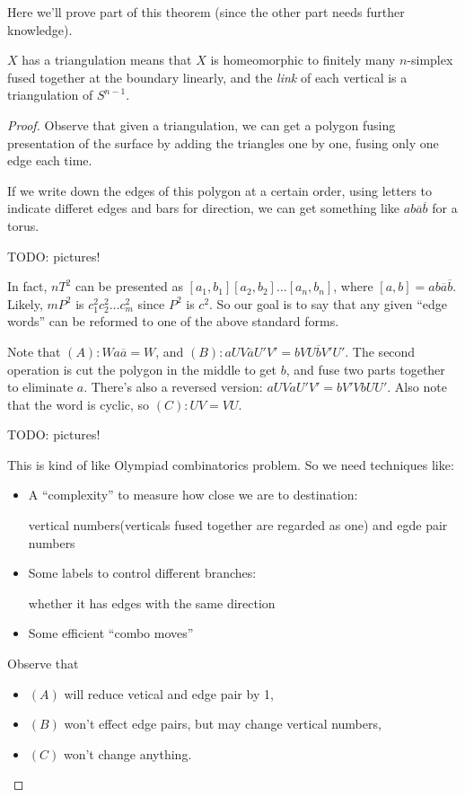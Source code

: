 Here we'll prove part of this theorem (since the other part needs further knowledge).
\begin{remark}
    $X$ has a triangulation means that $X$ is homeomorphic to finitely many
	$n$-simplex fused together at the boundary linearly, and the \textit{link} of
	each vertical is a triangulation of $S^{n-1}$.
\end{remark}

\begin{proof}[Proof]
    Observe that given a triangulation, we can get a polygon fusing presentation
	of the surface by adding the triangles one by one, fusing only one edge each time.

	If we write down the edges of this polygon at a certain order,
	using letters to indicate differet edges and bars for direction,
	we can get something like $ab\overline{a}\overline{b}$ for a torus.

	TODO: pictures!

	In fact, $nT^2$ can be presented as $[a_1,b_1][a_2,b_2]\dots[a_n, b_n]$,
	where $[a, b] = ab\overline{a}\overline{b}$.
	Likely, $mP^2$ is $c_1^2c_2^2\dots c_m^2$ since $P^2$ is $c^2$.
	So our goal is to say that any given ``edge words'' can be reformed
	to one of the above standard forms.

	Note that $(A): Wa\overline{a} = W$,
	and $(B): aUV\overline{a}U'V' = bVU\overline{b}V'U'$.
	The second operation is cut the polygon in the middle to get $b$, and
	fuse two parts together to eliminate $a$. There's also a reversed version:
	$aUVaU'V' = bV'VbUU'$.
	Also note that the word is cyclic, so $(C): UV = VU$.

	TODO: pictures!

	This is kind of like Olympiad combinatorics problem.
	So we need techniques like:
	\begin{itemize}
		\item A ``complexity'' to measure how close we are to destination:

			vertical numbers(verticals fused together are regarded as one)
			and egde pair numbers
		\item Some labels to control different branches:

			whether it has edges with the same direction
		\item Some efficient ``combo moves''
	\end{itemize}

	Observe that
	\begin{itemize}
		\item $(A)$ will reduce vetical and edge pair by 1,
		\item $(B)$ won't effect edge pairs, but may change vertical numbers,
		\item $(C)$ won't change anything.
	\end{itemize}


\end{proof}
